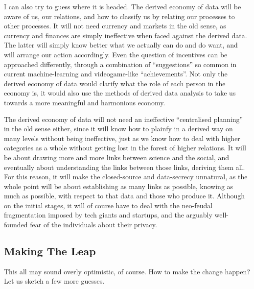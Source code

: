 \documentclass{article}
\begin{document}
I can also try to guess where it is headed. The derived economy of data will be aware of us, our relations, and how to classify us by relating our processes to other processes. It will not need currency and markets in the old sense, as currency and finances are simply ineffective when faced against the derived data. The latter will simply know better what we actually can do and do want, and will arrange our action accordingly.
Even the question of incentives can be approached differently, through a combination of
``suggestions'' so common in current machine-learning and videogame-like ``achievements''.
Not only the derived economy of data would clarify what the role
of each person in the economy is, it would also use the methods of
derived data analysis to take us towards a more meaningful and harmonious economy.

The derived economy of data will not need an ineffective “centralised planning” in the old sense either, since it will know how to plainfy in a derived way on many levels without being ineffective, just as we know how to deal with higher categories as a whole without getting lost in the forest of higher relations. It will be about drawing more and more links between science and the social, and eventually about understanding the links between those links, deriving them all. For this reason, it will make the closed-source and data-secrecy unnatural, as the whole point will be about establishing as many links as possible, knowing as much as possible, with respect to that data and those who produce it. Although on the initial stages, it will of course have to deal with the neo-feudal fragmentation imposed by tech giants and startups, and the arguably well-founded fear of the individuals about their privacy.


\subsection*{Making The Leap}

This all may sound overly optimistic, of course. How to make the change happen? Let
us sketch a few more guesses.
\end{document}
